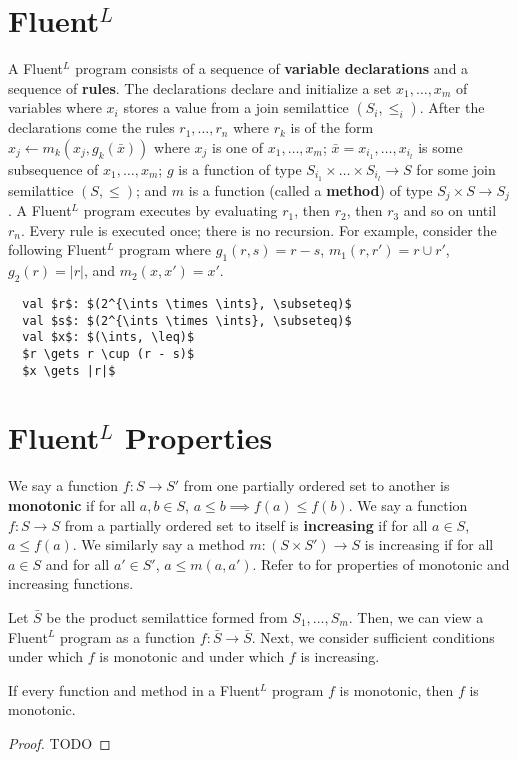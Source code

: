 \documentclass{mwhittaker}
\newcommand{\fluentl}{Fluent$^L$}
\begin{document}
\section{\fluentl}
A \fluentl{} program consists of a sequence of \textbf{variable declarations}
and a sequence of \textbf{rules}. The declarations declare and initialize a set
$x_1, \ldots, x_m$ of variables where $x_i$ stores a value from a join
semilattice $(S_i, \leq_i)$. After the declarations come the rules $r_1,
\ldots, r_n$ where $r_k$ is of the form $x_j \gets m_k(x_j, g_k(\bar{x}))$
where $x_j$ is one of $x_1, \ldots, x_m$; $\bar{x} = x_{i_1}, \ldots, x_{i_l}$
is some subsequence of $x_1, \ldots, x_m$; $g$ is a function of type $S_{i_1}
\times \ldots \times S_{i_l} \to S$ for some join semilattice $(S, \leq)$; and
$m$ is a function (called a \textbf{method}) of type $S_j \times S \to S_j$.
A \fluentl{} program executes by evaluating $r_1$, then $r_2$, then $r_3$ and
so on until $r_n$. Every rule is executed once; there is no recursion.  For
example, consider the following \fluentl{} program where $g_1(r, s) = r - s$,
$m_1(r, r') = r \cup r'$, $g_2(r) = |r|$, and $m_2(x, x') = x'$.

\begin{lstlisting}
  val $r$: $(2^{\ints \times \ints}, \subseteq)$
  val $s$: $(2^{\ints \times \ints}, \subseteq)$
  val $x$: $(\ints, \leq)$
  $r \gets r \cup (r - s)$
  $x \gets |r|$
\end{lstlisting}

\section{\fluentl{} Properties}
We say a function $f: S \to S'$ from one partially ordered set to another is
\textbf{monotonic} if for all $a, b \in S$, $a \leq b \implies f(a) \leq f(b)$.
We say a function $f: S \to S$ from a partially ordered set to itself is
\textbf{increasing} if for all $a \in S$, $a \leq f(a)$. We similarly say a
method $m: (S \times S') \to S$ is increasing if for all $a \in S$ and for all
$a' \in S'$, $a \leq m(a, a')$. Refer to  for properties of
monotonic and increasing functions.

Let $\bar{S}$ be the product semilattice formed from $S_1, \ldots, S_m$. Then,
we can view a \fluentl{} program as a function $f: \bar{S} \to \bar{S}$. Next,
we consider sufficient conditions under which $f$ is monotonic and under which
$f$ is increasing.

\begin{claim}
  If every function and method in a \fluentl{} program $f$ is monotonic, then
  $f$ is monotonic.
\end{claim}
\begin{proof}
  TODO
\end{proof}
\end{document}
